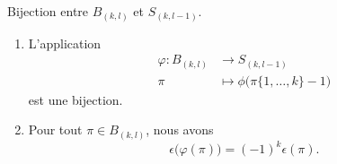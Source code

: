 \begin{lemma}		\label{LEMooEHTLooUSBBKL}
	Bijection entre \( B_{(k,l)}\) et \( S_{(k,l-1)}\).
	\begin{enumerate}
		\item
		      L'application
		      \begin{equation}
			      \begin{aligned}
				      \varphi\colon B_{(k,l)} & \to S_{(k,l-1)}                               \\
				      \pi                     & \mapsto \phi\big( \pi\{ 1,\ldots,k \}-1 \big)
			      \end{aligned}
		      \end{equation}
		      est une bijection.
		\item
		      Pour tout \( \pi\in B_{(k,l)}\), nous avons
		      \begin{equation}
			      \epsilon\big( \varphi(\pi) \big)=(-1)^k\epsilon(\pi).
		      \end{equation}
	\end{enumerate}
\end{lemma}

